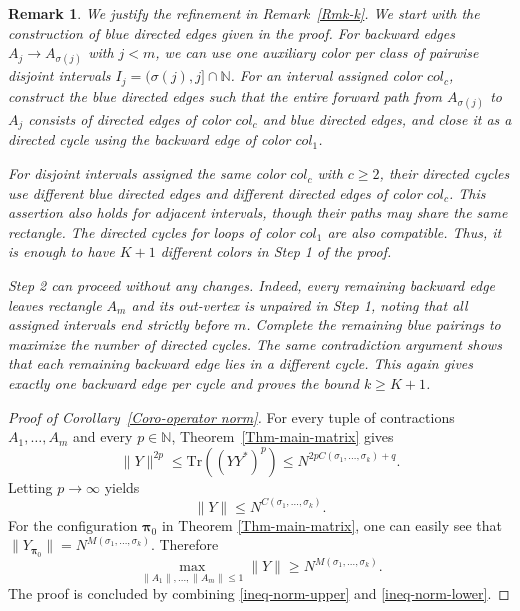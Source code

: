 \documentclass[12pt]{article}
\numberwithin{equation}{section}
\theoremstyle{plain}
\newtheorem{remark}[theorem]{Remark}
\def\bN{\mathbb N}
\def\Tr{\mathrm {Tr}}
\begin{document}
\begin{remark}\label{Rmk-k-proof}
We justify the refinement in Remark~\ref{Rmk-k}.
We start with the construction of blue directed edges given in the proof.
For backward edges $A_j\to A_{\sigma(j)}$ with $j<m$, we can use one auxiliary color per class of pairwise disjoint intervals $I_j=(\sigma(j),j] \cap \bN$. For an interval assigned color $col_c$, construct the blue directed edges such that the entire forward path from $A_{\sigma(j)}$ to $A_j$ consists of directed edges of color $col_c$ and blue directed edges, and close it as a directed cycle using the backward edge of color $col_1$.

For disjoint intervals assigned the same color $col_c$ with $c \ge 2$, their directed cycles use different blue directed edges and different directed edges of color $col_c$. This assertion also holds for adjacent intervals, though their paths may share the same rectangle. The directed cycles for loops of color $col_1$ are also compatible. Thus, it is enough to have $K+1$ different colors in Step 1 of the proof.

Step 2 can proceed without any changes.
Indeed, every remaining backward edge leaves rectangle $A_m$ and its out-vertex is unpaired in Step 1, noting that all assigned intervals end strictly before $m$. Complete the remaining blue pairings to maximize the number of directed cycles. The same contradiction argument shows that each remaining backward edge lies in a different cycle. This again gives exactly one backward edge per cycle and proves the bound $k\ge K+1$.
\end{remark}

\begin{proof}[Proof of Corollary~\ref{Coro-operator norm}]
For every tuple of contractions $A_1,\ldots,A_m$ and every $p\in\bN$, Theorem~\ref{Thm-main-matrix} gives
\[
\|Y\|^{2p}\le\Tr((YY^*)^p)\le N^{2pC(\sigma_1,\ldots,\sigma_k)+q}.
\]
Letting $p\to\infty$ yields
\begin{equation}\label{ineq-norm-upper}
\|Y\|\le N^{C(\sigma_1,\ldots,\sigma_k)}.
\end{equation}
For the configuration $\boldsymbol\pi_0$ in Theorem \ref{Thm-main-matrix}, one can easily see that $\|Y_{\boldsymbol\pi_0}\|=N^{M(\sigma_1,\ldots,\sigma_k)}$. Therefore
\begin{equation}\label{ineq-norm-lower}
\max_{\|A_1\|,\ldots,\|A_m\|\le1}\|Y\|\ge N^{M(\sigma_1,\ldots,\sigma_k)}.
\end{equation}
The proof is concluded by combining \eqref{ineq-norm-upper} and \eqref{ineq-norm-lower}.
\end{proof}
\end{document}
